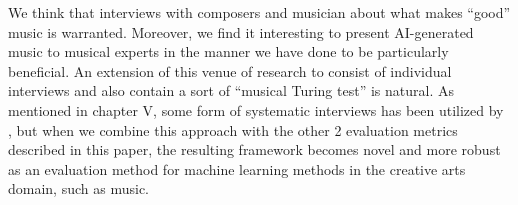 \documentclass{IEEEtran}
\begin{document}
We think that interviews with composers and musician about what makes ``good'' music 
is warranted. Moreover, we find it interesting to present AI-generated 
music to musical experts in the manner we have done to be particularly beneficial. 
An extension of this venue of research to consist of individual interviews
and also contain a sort of ``musical Turing test'' is natural. As mentioned in 
chapter V, some form of systematic interviews has been utilized by \citeauthor{sturm2017taking} 
\cite{sturm2017taking}, but when we combine this approach with the other 2 evaluation
metrics described in this paper, the resulting framework becomes novel and more robust as an
evaluation method for machine learning methods in the creative arts domain, such as music.

\vspace{3em}

\printbibliography
\end{document}
